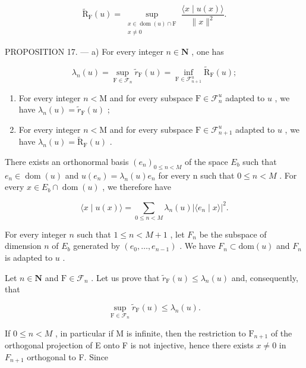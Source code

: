 \[
\widetilde{\mathrm{R}}_{\mathrm{F}}(u) = \sup_{\substack{x\in \operatorname{dom}(u)\cap \mathrm{F}\\ x\neq 0}}\frac{\langle x\mid u(x)\rangle}{\|x\|^ {2}}.
\]

PROPOSITION 17. --- a) For every integer \(n \in \mathbf{N}\) , one has

\[
\lambda_ {n} (u) = \sup _ {\mathrm{F} \in \mathcal {F} _ {n}} \widetilde {r} _ {\mathrm{F}} (u) = \inf _ {\mathrm{F} \in \mathcal {F} _ {n + 1} ^ {u}} \widetilde {\mathrm{R}} _ {\mathrm{F}} (u);
\]

\begin{enumerate}
\def\labelenumi{\alph{enumi})}
\setcounter{enumi}{1}
\item
  For every integer \(n < \mathrm{M}\) and for every subspace \(\mathrm{F} \in \mathcal{F}_n^u\) adapted to \(u\) , we have \(\lambda_n(u) = \widetilde{r}_{\mathrm{F}}(u)\) ;
\item
  For every integer \(n < \mathrm{M}\) and for every subspace \(\mathrm{F} \in \mathcal{F}_{n+1}^{u}\) adapted to \(u\) , we have \(\lambda_{n}(u) = \widetilde{\mathrm{R}}_{\mathrm{F}}(u)\) .
\end{enumerate}

There exists an orthonormal basis \((e_{n})_{0\leqslant n<M}\) of the space \(E_{b}\) such that \(e_{n}\in\operatorname{dom}(u)\) and \(u(e_{n})=\lambda_{n}(u)e_{n}\) for every n such that \(0\leqslant n<M\) . For every \(x\in E_{b}\cap\operatorname{dom}(u)\) , we therefore have

\[
\langle x \mid u (x) \rangle = \sum_ {0 \leqslant n <   M} \lambda_ {n} (u) | \langle e _ {n} \mid x \rangle | ^ {2}.
\]

For every integer \(n\) such that \(1 \leqslant n < M + 1\) , let \(F_n\) be the subspace of dimension \(n\) of \(E_b\) generated by \((e_0, \ldots, e_{n-1})\) . We have \(F_n \subset \text{dom}(u)\) and \(F_n\) is adapted to \(u\) .

Let \(n \in \mathbf{N}\) and \(\mathrm{F} \in \mathcal{F}_n\) . Let us prove that \(\widetilde{r}_{\mathrm{F}}(u) \leqslant \lambda_n(u)\) and, consequently, that

\[
\sup _ {\mathrm{F} \in \mathcal {F} _ {n}} \widetilde {r} _ {\mathrm{F}} (u) \leqslant \lambda_ {n} (u).\tag{19}
\]

If \(0 \leqslant n < M\) , in particular if M is infinite, then the restriction to \(\mathrm{F}_{n+1}\) of the orthogonal projection of E onto F is not injective, hence there exists \(x \neq 0\) in \(F_{n+1}\) orthogonal to F. Since

